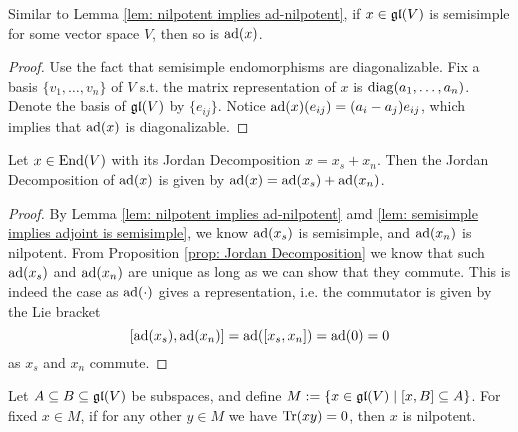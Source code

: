 \documentclass{article}
\begin{document}
\begin{lemma}\label{lem: semisimple implies adjoint is semisimple}
    Similar to Lemma \ref{lem: nilpotent implies ad-nilpotent}, if $x \in \mathfrak{gl}(V)$ is semisimple for some vector space $V$, then so is $\operatorname{ad}(x)$.
\end{lemma}

\begin{proof}
    Use the fact that semisimple endomorphisms are diagonalizable. Fix a basis $\{ v_1, \dots, v_n \}$ of $V$ s.t. the matrix representation of $x$ is $\operatorname{diag}( a_1, \dots, a_n )$. Denote the basis of $\mathfrak{gl}(V)$ by $\{ e_{ij} \}$. Notice $\operatorname{ad}(x)(e_{ij}) = (a_i - a_j) e_{ij}$, which implies that $\operatorname{ad}(x)$ is diagonalizable.
\end{proof}

\begin{proposition}
    Let $x \in \mathrm{End}(V)$ with its Jordan Decomposition $x = x_s + x_n$. Then the Jordan Decomposition of $\operatorname{ad}(x)$ is given by $\operatorname{ad}(x) = \operatorname{ad}(x_s) + \operatorname{ad}(x_n)$.
\end{proposition}

\begin{proof}
    By Lemma \ref{lem: nilpotent implies ad-nilpotent} amd \ref{lem: semisimple implies adjoint is semisimple}, we know $\operatorname{ad}(x_s)$ is semisimple, and $\operatorname{ad}(x_n)$ is nilpotent. From Proposition \ref{prop: Jordan Decomposition} we know that such $\operatorname{ad}(x_s)$ and $\operatorname{ad}(x_n)$ are unique as long as we can show that they commute. This is indeed the case as $\operatorname{ad}(\cdot)$ gives a representation, i.e. the commutator is given by the Lie bracket
    \[
        [\operatorname{ad}(x_s), \operatorname{ad}(x_n)] = \operatorname{ad}([x_s, x_n]) = \operatorname{ad}(0) = 0    
    \]
    as $x_s$ and $x_n$ commute.
\end{proof}

\begin{lemma}\label{lem: prep for Cartan's 1st Criterion}
    Let $A \subseteq B \subseteq \mathfrak{gl}(V)$ be subspaces, and define $M := \{ x \in \mathfrak{gl}(V) \mid [x, B] \subseteq A \}$. For fixed $x \in M$, if for any other $y \in M$ we have $\operatorname{Tr}(xy) = 0$, then $x$ is nilpotent.
\end{lemma}
\end{document}
